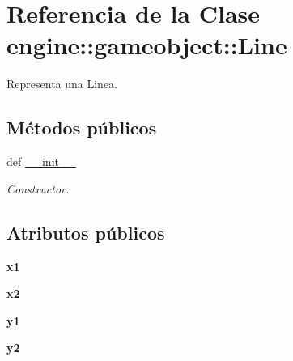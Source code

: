 \hypertarget{classengine_1_1gameobject_1_1Line}{
\section{\-Referencia de la \-Clase engine\-:\-:gameobject\-:\-:\-Line}
\label{classengine_1_1gameobject_1_1Line}
}


\-Representa una \-Linea.  


\subsection*{\-Métodos públicos}
\begin{DoxyCompactItemize}
\item 
def \hyperlink{classengine_1_1gameobject_1_1Line_a4ab640ba0cad632554b4e1abd8053694}{\-\_\-\-\_\-init\-\_\-\-\_\-}
\begin{DoxyCompactList}\small\item\em \-Constructor. \end{DoxyCompactList}\end{DoxyCompactItemize}
\subsection*{\-Atributos públicos}
\begin{DoxyCompactItemize}
\item 
\hypertarget{classengine_1_1gameobject_1_1Line_a2af24708dfae348f592f18df471f3055}{
{\bfseries x1}}
\label{classengine_1_1gameobject_1_1Line_a2af24708dfae348f592f18df471f3055}

\item 
\hypertarget{classengine_1_1gameobject_1_1Line_aeee0411dbc82a2cc8dd9ea3c94f4563f}{
{\bfseries x2}}
\label{classengine_1_1gameobject_1_1Line_aeee0411dbc82a2cc8dd9ea3c94f4563f}

\item 
\hypertarget{classengine_1_1gameobject_1_1Line_aaa74c87d4dc0a5a79759ad1a6ba54906}{
{\bfseries y1}}
\label{classengine_1_1gameobject_1_1Line_aaa74c87d4dc0a5a79759ad1a6ba54906}

\item 
\hypertarget{classengine_1_1gameobject_1_1Line_ac1c8c343651c1194e22ee9f355fa6874}{
{\bfseries y2}}
\label{classengine_1_1gameobject_1_1Line_ac1c8c343651c1194e22ee9f355fa6874}

\end{DoxyCompactItemize}


